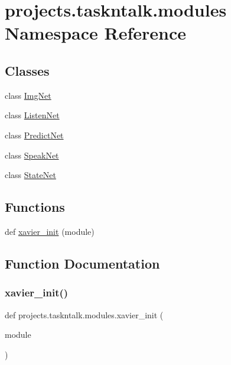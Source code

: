 \hypertarget{namespaceprojects_1_1taskntalk_1_1modules}{}\section{projects.\+taskntalk.\+modules Namespace Reference}
\label{namespaceprojects_1_1taskntalk_1_1modules}
\subsection*{Classes}
\begin{DoxyCompactItemize}
\item 
class \hyperlink{classprojects_1_1taskntalk_1_1modules_1_1ImgNet}{Img\+Net}
\item 
class \hyperlink{classprojects_1_1taskntalk_1_1modules_1_1ListenNet}{Listen\+Net}
\item 
class \hyperlink{classprojects_1_1taskntalk_1_1modules_1_1PredictNet}{Predict\+Net}
\item 
class \hyperlink{classprojects_1_1taskntalk_1_1modules_1_1SpeakNet}{Speak\+Net}
\item 
class \hyperlink{classprojects_1_1taskntalk_1_1modules_1_1StateNet}{State\+Net}
\end{DoxyCompactItemize}
\subsection*{Functions}
\begin{DoxyCompactItemize}
\item 
def \hyperlink{namespaceprojects_1_1taskntalk_1_1modules_a483197f0d561a3d1ef7d04a2de70e571}{xavier\+\_\+init} (module)
\end{DoxyCompactItemize}


\subsection{Function Documentation}
\mbox{\label{namespaceprojects_1_1taskntalk_1_1modules_a483197f0d561a3d1ef7d04a2de70e571}} 
\subsubsection{\texorpdfstring{xavier\+\_\+init()}{xavier\_init()}}
{\footnotesize\ttfamily def projects.\+taskntalk.\+modules.\+xavier\+\_\+init (\begin{DoxyParamCaption}\item[{}]{module }\end{DoxyParamCaption})}

